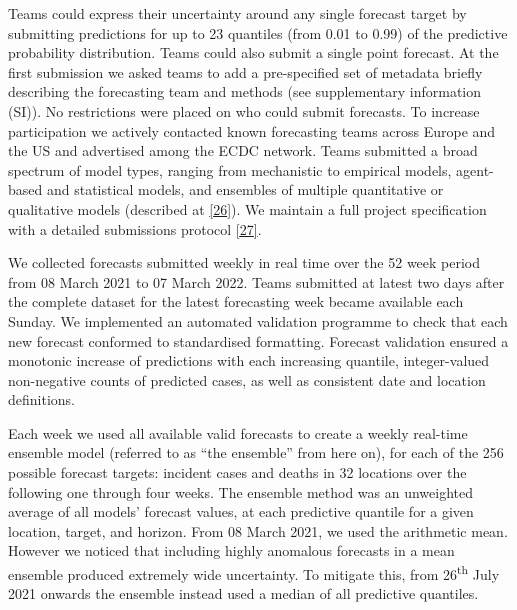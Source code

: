\documentclass[
]{article}
\providecommand{\DIFaddbegin}{} %
\providecommand{\DIFaddend}{} %
\providecommand{\DIFdelbegin}{} %
\providecommand{\DIFdelend}{} %
\newcommand{\DIFscaledelfig}{0.5}
\newlength{\DIFdelgraphicswidth} %
\newlength{\DIFdelgraphicsheight} %
\newcommand{\DIFaddincludegraphics}[2][]{{\color{blue}\fbox{\DIFOincludegraphics[#1]{#2}}}} %
\newcommand{\DIFdelincludegraphics}[2][]{%
\sbox{\DIFdelgraphicsbox}{\DIFOincludegraphics[#1]{#2}}%
\settoboxwidth{\DIFdelgraphicswidth}{\DIFdelgraphicsbox} %
\settoboxtotalheight{\DIFdelgraphicsheight}{\DIFdelgraphicsbox} %
\scalebox{\DIFscaledelfig}{%
\parbox[b]{\DIFdelgraphicswidth}{\usebox{\DIFdelgraphicsbox}\\[-\baselineskip] \rule{\DIFdelgraphicswidth}{0em}}\llap{\resizebox{\DIFdelgraphicswidth}{\DIFdelgraphicsheight}{%
\setlength{\unitlength}{\DIFdelgraphicswidth}%
\begin{picture}(1,1)%
\thicklines\linethickness{2pt} %
{\color[rgb]{1,0,0}\put(0,0){\framebox(1,1){}}}%
{\color[rgb]{1,0,0}\put(0,0){\line( 1,1){1}}}%
{\color[rgb]{1,0,0}\put(0,1){\line(1,-1){1}}}%
\end{picture}%
}\hspace*{3pt}}} %
} %
\DeclareRobustCommand{\DIFaddbegin}{\DIFOaddbegin \let\includegraphics\DIFaddincludegraphics} %
\DeclareRobustCommand{\DIFaddend}{\DIFOaddend \let\includegraphics\DIFOincludegraphics} %
\DeclareRobustCommand{\DIFdelbegin}{\DIFOdelbegin \let\includegraphics\DIFdelincludegraphics} %
\DeclareRobustCommand{\DIFdelend}{\DIFOaddend \let\includegraphics\DIFOincludegraphics} %
\begin{document}
Teams could express their uncertainty around any single forecast target by submitting predictions for up to 23 quantiles (from 0.01 to 0.99) of the predictive probability distribution. Teams could also submit a single point forecast. At the first submission we asked teams to add a pre-specified set of metadata briefly describing the forecasting team and methods (see supplementary information (SI)). No restrictions were placed on who could submit forecasts. To increase participation we actively contacted known forecasting teams across Europe and the US and advertised among the ECDC network. Teams submitted a broad spectrum of model types, ranging from mechanistic to empirical models, agent-based and statistical models, and ensembles of multiple quantitative or qualitative models (described at \protect\DIFdelbegin %
\DIFdelend \DIFaddbegin \hyperlink{ref-europeancovid-19forecasthubCommunity}{{[}26{]}}\DIFaddend ). We maintain a full project specification with a detailed submissions protocol \protect\DIFdelbegin %
\DIFdelend \DIFaddbegin \hyperlink{ref-europeancovid-19forecasthubCovid19forecasthubeuropeWiki}{{[}27{]}}\DIFaddend .

We collected forecasts submitted weekly in real time over the 52 week period from 08 March 2021 to 07 March 2022. Teams submitted at latest two days after the complete dataset for the latest forecasting week became available each Sunday. We implemented an automated validation programme to check that each new forecast conformed to standardised formatting. Forecast validation ensured a monotonic increase of predictions with each increasing quantile, integer-valued non-negative counts of predicted cases, as well as consistent date and location definitions.

Each week we used all available valid forecasts to create a weekly real-time ensemble model (referred to as ``the ensemble'' from here on), for each of the 256 possible forecast targets: incident cases and deaths in 32 locations over the following one through four weeks. The ensemble method was an unweighted average of all models' forecast values, at each predictive quantile for a given location, target, and horizon. From 08 March 2021, we used the arithmetic mean. However we noticed that including highly anomalous forecasts in a mean ensemble produced extremely wide uncertainty. To mitigate this, from 26\textsuperscript{th} July 2021 onwards the ensemble instead used a median of all predictive quantiles.
\end{document}
